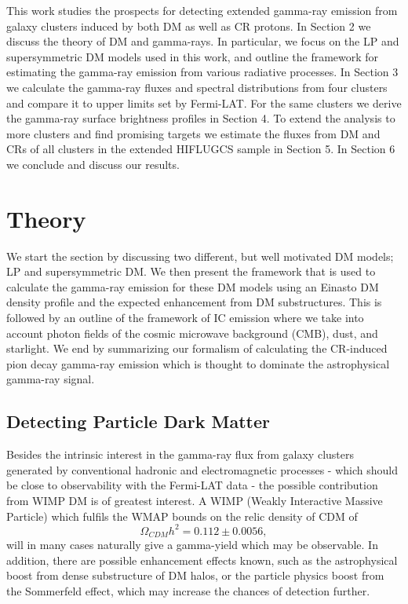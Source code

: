 \documentclass[10pt,aps,pra,reprint,amsmath,amsfonts,amssymb,showpacs,nofootinbib,floatfix]{revtex4-1}
\begin{document}
This work studies the prospects for detecting extended gamma-ray
emission from galaxy clusters induced by both DM as well as CR
protons. In Section 2 we discuss the theory of DM and gamma-rays. In
particular, we focus on the LP and supersymmetric DM models
used in this work, and outline the framework for estimating the
gamma-ray emission from various radiative processes. In Section 3
we calculate the gamma-ray fluxes and spectral distributions from four
clusters and compare it to upper limits set by Fermi-LAT. For the same
clusters we derive the gamma-ray surface brightness profiles in
Section 4. To extend the analysis to more clusters and find
promising targets we estimate the fluxes from DM and CRs of all
clusters in the extended HIFLUGCS sample in Section 5. In Section
6 we conclude and discuss our results.

\section{Theory}
\label{sect:theory}
We start the section by discussing two different, but well motivated
DM models; LP and supersymmetric DM. We then present the framework
that is used to calculate the gamma-ray emission for these DM models
using an Einasto DM density profile and the expected enhancement from
DM substructures. This is followed by an outline of the framework of
IC emission where we take into account photon fields of the cosmic
microwave background (CMB), dust, and starlight. We end by summarizing
our formalism of calculating the CR-induced pion decay gamma-ray
emission which is thought to dominate the astrophysical gamma-ray
signal.


\subsection{Detecting Particle Dark Matter}
\label{sect:PF}
Besides the intrinsic interest in the gamma-ray flux from galaxy
clusters generated by conventional hadronic and electromagnetic
processes - which should be close to observability with the Fermi-LAT
data
\cite{1997ApJ...487..529B,2007A&A...473...41E,2010MNRAS.409..449P} -
the possible contribution from WIMP DM is of greatest interest. A WIMP
(Weakly Interactive Massive Particle) which fulfils the WMAP bounds on
the relic density of CDM of \cite{Komatsu:2010fb}
$$\Omega_{CDM}h^2=0.112\pm 0.0056,$$ will in many cases naturally give
a gamma-yield which may be observable. In addition, there are possible
enhancement effects known, such as the astrophysical boost from dense
substructure of DM halos, or the particle physics boost from the
Sommerfeld effect, which may increase the chances of detection
further.
\end{document}
